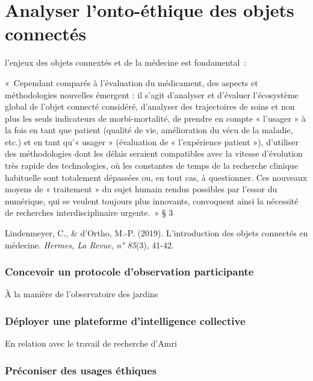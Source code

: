 \documentclass[
  letterpaper,
  DIV=11,
  numbers=noendperiod]{scrreprt}
\begin{document}
\hypertarget{sec-analyserOntoEthique}{%
\chapter{Analyser l'onto-éthique des objets
connectés}\label{sec-analyserOntoEthique}}

l'enjeux des objets connextés et de la médecine est fondamental~:

«~Cependant comparés à l'évaluation du médicament, des aspects et
méthodologies nouvelles émergent : il s'agit d'analyser et d'évaluer
l'écosystème global de l'objet connecté considéré, d'analyser des
trajectoires de soins et non plus les seuls indicateurs de
morbi-mortalité, de prendre en compte « l'usager » à la fois en tant que
patient (qualité de vie, amélioration du vécu de la maladie, etc.) et en
tant qu'« usager » (évaluation de « l'expérience patient »), d'utiliser
des méthodologies dont les délais seraient compatibles avec la vitesse
d'évolution très rapide des technologies, où les constantes de temps de
la recherche clinique habituelle sont totalement dépassées ou, en tout
cas, à questionner. Ces nouveaux moyens de « traitement » du sujet
humain rendus possibles par l'essor du numérique, qui se veulent
toujours plus innovants, convoquent ainsi la nécessité de recherches
interdisciplinaire urgente.~» § 3

Lindenmeyer, C., \& d'Ortho, M.-P. (2019). L'introduction des objets
connectés en médecine. \emph{Hermes, La Revue}, \emph{n° 85}(3), 41‑42.

\hypertarget{concevoir-un-protocole-dobservation-participante}{%
\subsection{Concevoir un protocole d'observation
participante}\label{concevoir-un-protocole-dobservation-participante}}

À la manière de l'observatoire des jardins

\hypertarget{duxe9ployer-une-plateforme-dintelligence-collective}{%
\subsection{Déployer une plateforme d'intelligence
collective}\label{duxe9ployer-une-plateforme-dintelligence-collective}}

En relation avec le travail de recherche d'Amri

\hypertarget{pruxe9coniser-des-usages-uxe9thiques}{%
\subsection{Préconiser des usages
éthiques}\label{pruxe9coniser-des-usages-uxe9thiques}}
\end{document}
